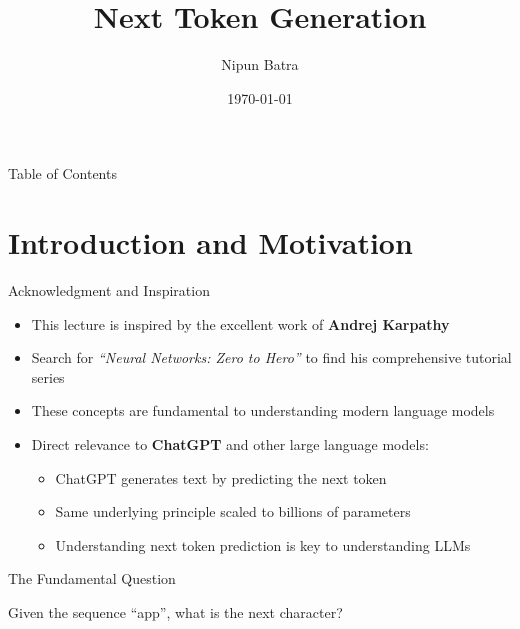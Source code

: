\documentclass[usenames,dvipsnames]{beamer}
\title{Next Token Generation}
\date{\today}
\author{Nipun Batra}
\institute{IIT Gandhinagar}
\begin{document}
\maketitle

\begin{frame}{Table of Contents}
\tableofcontents
\end{frame}

\section{Introduction and Motivation}

\begin{frame}{Acknowledgment and Inspiration}
\begin{itemize}[<+->]
\item This lecture is inspired by the excellent work of \textbf{Andrej Karpathy}
\item Search for \textit{``Neural Networks: Zero to Hero''} to find his comprehensive tutorial series
\item These concepts are fundamental to understanding modern language models
\item Direct relevance to \textbf{ChatGPT} and other large language models:
\begin{itemize}
\item ChatGPT generates text by predicting the next token
\item Same underlying principle scaled to billions of parameters
\item Understanding next token prediction is key to understanding LLMs
\end{itemize}
\end{itemize}
\end{frame}

\begin{frame}{The Fundamental Question}
\vspace{0.5cm}
\begin{center}
\end{center}

\vspace{0.8cm}
\begin{center}
{\Large Given the sequence ``app'', what is the next character?}
\end{center}
\end{frame}
\end{document}
